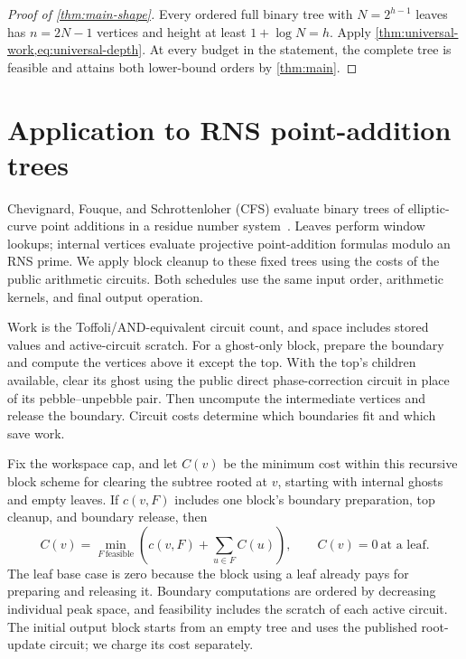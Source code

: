 \documentclass[11pt]{article}
\theoremstyle{definition}
\theoremstyle{remark}
\begin{document}
\begin{proof}[Proof of \cref{thm:main-shape}]
Every ordered full binary tree with $N=2^{h-1}$ leaves has $n=2N-1$ vertices and height at least $1+\log N=h$. Apply \cref{thm:universal-work,eq:universal-depth}. At every budget in the statement, the complete tree is feasible and attains both lower-bound orders by \cref{thm:main}.
\end{proof}

\section{Application to RNS point-addition trees}
\label{sec:cfs-case-study}

Chevignard, Fouque, and Schrottenloher (CFS) evaluate binary trees of elliptic-curve point additions in a residue number system~\cite{CFS2026}. Leaves perform window lookups; internal vertices evaluate projective point-addition formulas modulo an RNS prime. We apply block cleanup to these fixed trees using the costs of the public arithmetic circuits. Both schedules use the same input order, arithmetic kernels, and final output operation.

Work is the Toffoli/AND-equivalent circuit count, and space includes stored values and active-circuit scratch. For a ghost-only block, prepare the boundary and compute the vertices above it except the top. With the top's children available, clear its ghost using the public direct phase-correction circuit in place of its pebble--unpebble pair. Then uncompute the intermediate vertices and release the boundary. Circuit costs determine which boundaries fit and which save work.

Fix the workspace cap, and let $C(v)$ be the minimum cost within this recursive block scheme for clearing the subtree rooted at $v$, starting with internal ghosts and empty leaves. If $c(v,F)$ includes one block's boundary preparation, top cleanup, and boundary release, then
\begin{equation}
 C(v)=\min_{F\ \mathrm{feasible}}\left(c(v,F)+\sum_{u\in F}C(u)\right),
 \qquad C(v)=0\ \text{at a leaf}.
 \label{eq:cfs-cut-work}
\end{equation}
The leaf base case is zero because the block using a leaf already pays for preparing and releasing it. Boundary computations are ordered by decreasing individual peak space, and feasibility includes the scratch of each active circuit. The initial output block starts from an empty tree and uses the published root-update circuit; we charge its cost separately.
\end{document}
